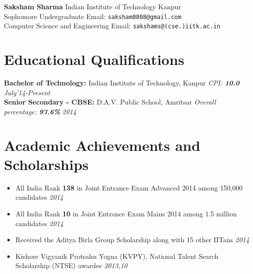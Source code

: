 \documentclass[11pt,a4paper]{article}
\begin{document}
\textbf{\huge{Saksham Sharma}} \hfill{Indian Institute of Technology Kanpur}\\
Sophomore Undergraduate    \hfill Email: \texttt{saksham0808@gmail.com}\\
Computer Science and Engineering      \hfill  Email: \texttt{sakshams@(cse.)iitk.ac.in}\\

\vspace{-0.7cm}
\section*{Educational Qualifications}
\vspace{-0.2cm}
\textbf{\large{Bachelor of Technology:}} Indian Institute of Technology, Kanpur \emph{CPI: \textbf{10.0}} \hfill\textit{ July'14-Present}\\
\textbf{\large{Senior Secondary - CBSE:}} D.A.V. Public School, Amritsar \emph{Overall percentage: \textbf{97.6\%}} \hfill\textit{ 2014}


\vspace{-0.4cm}
\section*{Academic Achievements and Scholarships}
\vspace{-0.2cm}
\begin {itemize}
\item All India Rank \textbf{138} in Joint Entrance Exam Advanced 2014 among 150,000 candidates            	\hfill \textit{2014}
\item All India Rank \textbf{10} in Joint Entrance Exam Mains 2014 among 1.5 million candidates              \hfill \textit{2014}
\item Received the Aditya Birla Group Scholarship along with 15 other IITans                        \hfill \textit{2014}
\item Kishore Vigyanik Protsahn Yogna (KVPY), National Talent Search Scholarship (NTSE) awardee
      \hfill \textit{2013,10}
\end{itemize}

\vspace{-0.4cm}
\end{document}
